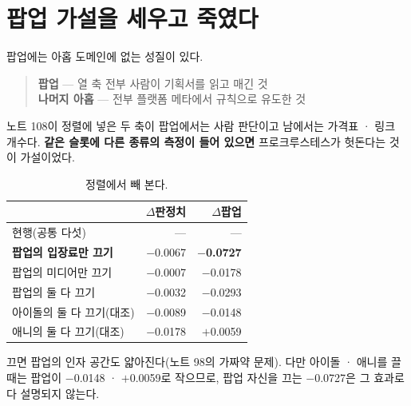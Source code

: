 \documentclass[10pt]{article}
\begin{document}

\section{팝업 가설을 세우고 죽였다}

팝업에는 아홉 도메인에 없는 성질이 있다.

\begin{quote}\fontsize{9.5}{11.5}\selectfont
\textbf{팝업} --- 열 축 전부 사람이 기획서를 읽고 매긴 것\\
\textbf{나머지 아홉} --- 전부 플랫폼 메타에서 규칙으로 유도한 것
\end{quote}

노트 108이 정렬에 넣은 두 축이 팝업에서는 사람 판단이고 남에서는 가격표 ·
링크 개수다. \textbf{같은 슬롯에 다른 종류의 측정이 들어 있으면} 프로크루스테스가
헛돈다는 것이 가설이었다.

\begin{table}[t]
\centering\tsize
\caption{정렬에서 빼 본다.}
\begin{tabular}{lrr}
\toprule
& $\Delta$판정치 & $\Delta$팝업 \\
\midrule
현행(공통 다섯) & --- & --- \\
\textbf{팝업의 입장료만 끄기} & $-$0.0067 & \textbf{$-$0.0727} \\
팝업의 미디어만 끄기 & $-$0.0007 & $-$0.0178 \\
팝업의 둘 다 끄기 & $-$0.0032 & $-$0.0293 \\
\midrule
아이돌의 둘 다 끄기(대조) & $-$0.0089 & $-$0.0148 \\
애니의 둘 다 끄기(대조) & $-$0.0178 & $+$0.0059 \\
\bottomrule
\end{tabular}
\end{table}

{끄면 팝업의 인자 공간도 얇아진다(노트 98의 가짜약 문제). 다만 아이돌 ·
애니를 끌 때는 팝업이 $-$0.0148 · $+$0.0059로 작으므로, 팝업 자신을 끄는
$-$0.0727은 그 효과로 다 설명되지 않는다.}
\end{document}
